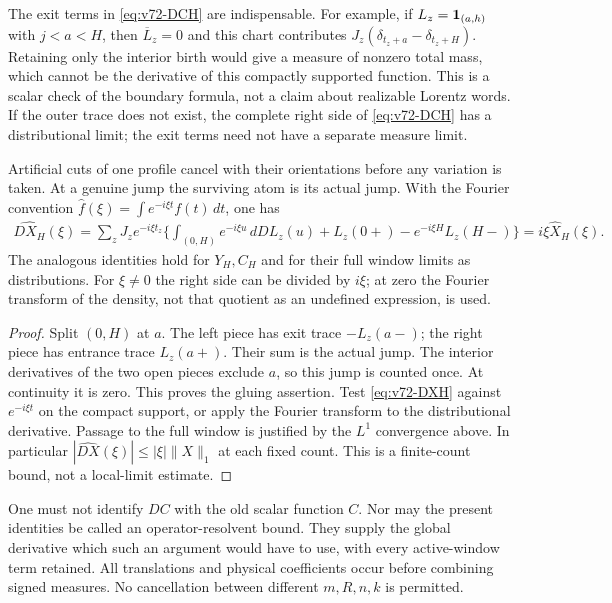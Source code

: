 The exit terms in \eqref{eq:v72-DCH} are indispensable. For example,
if $L_z=\mathbf1_{(a,h)}$ with $j<a<H$, then $\overline L_z=0$
and this chart contributes
$J_z(\delta_{t_z+a}-\delta_{t_z+H})$. Retaining only the interior
birth would give a measure of nonzero total mass, which cannot be
the derivative of this compactly supported function. This is a scalar
check of the boundary formula, not a claim about realizable Lorentz
words. If the outer trace does not exist, the complete right side of
\eqref{eq:v72-DCH} has a distributional limit; the exit terms need
not have a separate measure limit.

\begin{proposition}
\label{prop:v72-window-fourier}
Artificial cuts of one profile cancel with their orientations before
any variation is taken. At a genuine jump the surviving atom is its
actual jump. With the Fourier convention
$\widehat f(\xi)=\int e^{-i\xi t}f(t)\,dt$, one has
\begin{equation}\label{eq:v72-window-fourier}
 \begin{split}
 \widehat{DX_H}(\xi)=\sum_zJ_ze^{-i\xi t_z}
 \bigg\{\int_{(0,H)}e^{-i\xi u}\,dDL_z(u)
       +L_z(0+)-e^{-i\xi H}L_z(H-)\bigg\}
       =i\xi\widehat X_H(\xi).
 \end{split}
\end{equation}
The analogous identities hold for $Y_H,C_H$ and for their full
window limits as distributions. For $\xi\ne0$ the right side can
be divided by $i\xi$; at zero the Fourier transform of the density,
not that quotient as an undefined expression, is used.
\end{proposition}
\begin{proof}
Split $(0,H)$ at $a$. The left piece has exit trace $-L_z(a-)$;
the right piece has entrance trace $L_z(a+)$. Their sum is the
actual jump. The interior derivatives of the two open pieces exclude
$a$, so this jump is counted once. At continuity it is zero. This
proves the gluing assertion. Test \eqref{eq:v72-DXH} against
$e^{-i\xi t}$ on the compact support, or apply the Fourier transform
to the distributional derivative. Passage to the full window is
justified by the $L^1$ convergence above. In particular
$|\widehat{DX}(\xi)|\le |\xi|\|X\|_1$ at each fixed count.
This is a finite-count bound, not a local-limit estimate.
\end{proof}

One must not identify $DC$ with the old scalar function $C$. Nor
may the present identities be called an operator-resolvent bound.
They supply the global derivative which such an argument would have
to use, with every active-window term retained. All translations and
physical coefficients occur before combining signed measures. No
cancellation between different $m,R,n,k$ is permitted.
